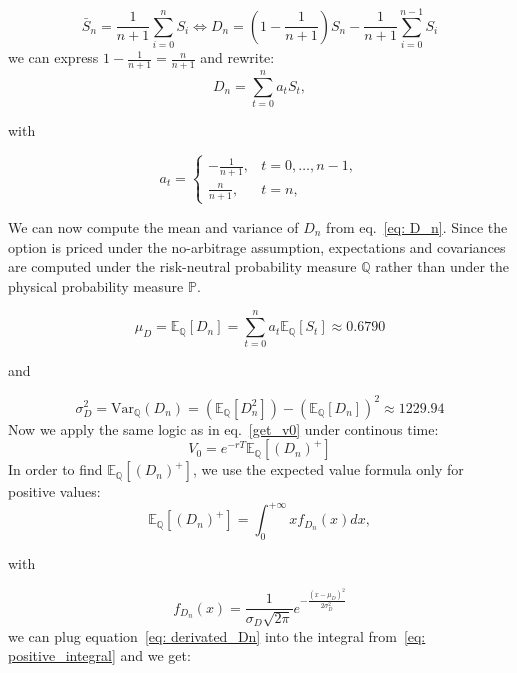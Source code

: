 \documentclass[hidelinks, 12pt, a4paper]{article}
\theoremstyle{definition}
\newcommand{\Var}{\mathrm{Var}}
\begin{document}
\begin{equation}
  \bar{S}_n = \frac{1}{n+1}\sum_{i=0}^{n} S_i \iff D_n = (1 - \frac{1}{n+1})S_n- \frac{1}{n+1}\sum_{i=0}^{n-1} S_i
\end{equation}
\break
\noindent we can express $1-\frac{1}{n+1} = \frac{n}{n+1}$ and rewrite:
\begin{equation}
  D_n = \sum_{t=0}^n a_t S_t,
  \label{eq: D_n}
\end{equation}

\noindent with

\begin{equation}
  a_t =
  \begin{cases}
    -\frac{1}{n+1}, & t=0,\dots,n-1,\\
    \frac{n}{n+1}, & t=n,
  \end{cases}
\end{equation}
\break

We can now compute the mean and variance of $D_n$ from eq.~\ref{eq: D_n}. 
Since the option is priced under the no-arbitrage assumption, expectations and 
covariances are computed under the risk-neutral probability measure $\mathbb{Q}$ 
rather than under the physical probability measure $\mathbb{P}$.

\begin{equation}
  \mu_D = \mathbb{E}_\mathbb{Q}[D_n] = \sum_{t=0}^n a_t \mathbb E_\mathbb{Q}[S_t] \approx 0.6790  
\end{equation}

\noindent and

\begin{equation}
  \sigma_D^2 = \Var_\mathbb{Q}(D_n) = (\mathbb{E}_\mathbb{Q}[D_n^2]) - (\mathbb{E}_\mathbb{Q}[D_n])^2 \approx 1229.94
\end{equation}
\break
Now we apply the same logic as in eq.~\ref{get_v0} under continous time:
\begin{equation}
  V_0 = e^{-rT}\mathbb{E}_\mathbb{Q}[(D_n)^+]
\end{equation}
\noindent In order to find $\mathbb{E}_\mathbb{Q}[(D_n)^+]$, we use the expected value formula only for positive values:
\begin{equation}
  \mathbb{E}_\mathbb{Q}[(D_n)^+] = \int_0^{+\infty} x f_{D_n}(x) dx, 
  \label{eq: positive_integral}
\end{equation}

\noindent with

\begin{equation}
  f_{D_n}(x) = \frac{1}{\sigma_D \sqrt{2\pi}} e^{-\frac{(x-\mu_D)^2}{2\sigma_D^2}}
  \label{eq: derivated_Dn}
\end{equation}
\break
we can plug equation~\ref{eq: derivated_Dn} into the integral from~\ref{eq: positive_integral} and we get:
\end{document}
